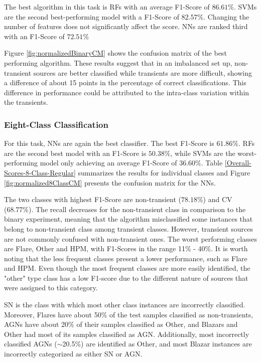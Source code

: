 \documentclass[twocolumn]{aastex62}
\begin{document}
The best algorithm in this task is RFs with an average F1-Score of
$86.61\%$.   
SVMs are the second best-performing model with a F1-Score of $82.57\%$. 
Changing the number of features does not significantly affect the score.
NNs are ranked third with an F1-Score of $72.51\%$

Figure \ref{fig:normalizedBinaryCM} shows the confusion matrix of the best
performing algorithm. These results suggest that in an imbalanced set
up, non-transient sources are better classified while transients are
more difficult, showing a difference of about  15 points in the
percentage of correct classifications.  
This difference in performance could be attributed to the intra-class
variation within the transients.


\subsubsection{Eight-Class Classification}

For this task, NNs are again the best classifier.  
The best F1-Score is $61.86\%$. 
RFs are the second best model with an F1-Score is $50.38\%$, while
SVMs are the worst-performing model only achieving an average F1-Score
of $36.60\%$.   
Table \ref{Overall-Scores-8-Class-Regular} summarizes the results for 
individual classes and Figure  \ref{fig:normalized8ClassCM} presents 
the confusion matrix for the NNs.

The two classes with highest F1-Score are non-transient ($78.18\%$) and
CV (68.77\%).  
The recall decreases for the non-transient class in comparison to the binary experiment, 
meaning that the algorithm misclassified some instances that belong to non-transient class
among transient classes. 
However, transient sources are not commonly confused with non-transient ones. 
The worst performing classes are Flare, Other and HPM, with F1-Scores in the 
range 11\% - 40\%. 
It is worth noting that the less frequent classes present a lower performance, 
such as Flare and HPM. 
Even though the most frequent classes are more easily identified, 
the "other" type class has a low F1-score due to the different nature 
of sources that were assigned to this category. 


SN is the class with which most other class instances are
incorrectly classified. 
Moreover, Flares have about 50\% of the test samples classified as
non-transients, AGNs have about 20\% of their 
samples classified as Other, and Blazars and Other had most of  its
samples classified as AGN. 
Additionally, most incorrectly classified AGNs ($\sim$20.5\%) are
identified as Other, and most Blazar instances are
incorrectly categorized as either SN or AGN. 
\end{document}

